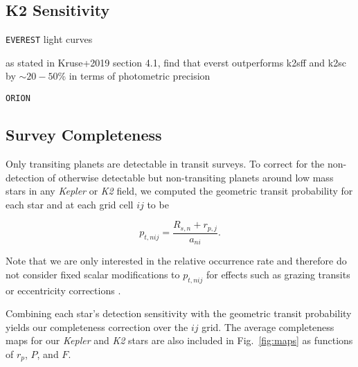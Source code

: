 \documentclass[modern]{aastex63}
\newcommand\kepler{\emph{Kepler}}
\newcommand\ktwo{\emph{K2}}
\begin{document}
\subsection{K2 Sensitivity}
\texttt{EVEREST} light curves \citep{luger16,luger18}

as stated in Kruse+2019 section 4.1, \cite{luger16} find that everst outperforms k2sff and k2sc by $\sim 20-50$\% in terms of photometric precision

\texttt{ORION} \citep{cloutier19b}

\begin{figure*}
  \centering
  \caption{Average detection sensitivity and completeness versus orbital period and planetary radius.
    \emph{Top panels}: the average detection sensitivity for the \kepler{} and \ktwo{} stars in our stellar
    sample as functions of planetary radius and orbital period. \emph{Bottom panels}: the average completeness
    for the \kepler{} and \ktwo{} stars computed as the product of the detection sensitivity and transit
    probability (Eq.~\ref{eq:ptransit}).} 
  \label{fig:compmap}
\end{figure*}



\subsection{Survey Completeness}
Only transiting planets are detectable in transit surveys. To correct for the non-detection of otherwise
detectable but non-transiting planets around low mass stars in any \kepler{} or \ktwo{} field, we computed
the geometric transit probability for each star and at each grid cell $ij$ to be

\begin{equation}
  p_{t,nij} = \frac{R_{s,n} + r_{p,j}}{a_{ni}}. \label{eq:ptransit}
\end{equation}

\noindent Note that we are only interested in the relative occurrence rate and therefore do not consider
fixed scalar modifications to $p_{t,nij}$ for effects such as grazing transits or eccentricity corrections
\citep{barnes07b}.

Combining each star's detection sensitivity with the geometric transit probability yields our completeness
correction over the $ij$ grid. The average completeness maps for our \kepler{} and \ktwo{} stars are also
included in Fig.~\ref{fig:maps} as functions of $r_p$, $P$, and $F$.
\end{document}
